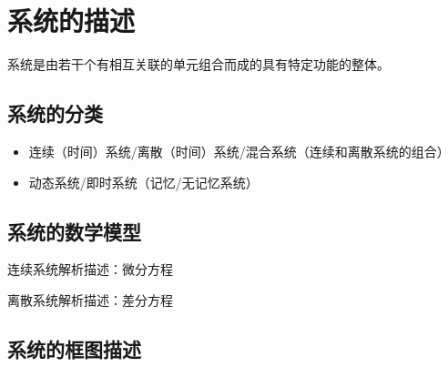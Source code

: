 \section{系统的描述}

系统是由若干个有相互关联的单元组合而成的具有特定功能的整体。

\subsection{系统的分类}

\begin{itemize}
    \item 连续（时间）系统/离散（时间）系统/混合系统（连续和离散系统的组合）
    \item 动态系统/即时系统（记忆/无记忆系统）
\end{itemize}

\subsection{系统的数学模型}

连续系统解析描述：微分方程

离散系统解析描述：差分方程

\subsection{系统的框图描述}


